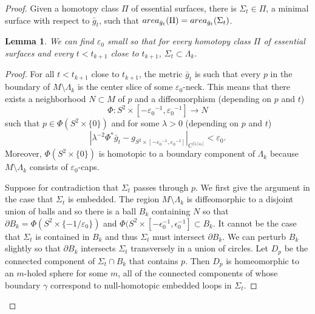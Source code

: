 \documentclass[11pt]{amsart}
\newtheorem{lemm}[thm]{Lemma}
\theoremstyle{remark}
\theoremstyle{definition}
\begin{document}
{{\begin{proof}
		Given a homotopy class $\Pi$ of essential surfaces, there is $\Sigma_t\in \Pi$, a minimal surface with respect to $\bar g_t$, such that ${\rm area}_{\bar g_t}(\Pi)={\rm area}_{\bar g_t}(\Sigma_t)$.
		
		\begin{lemm}We can find $\varepsilon_0$ small so that for every homotopy class $\Pi$ of essential surfaces  and  every  $t<t_{k+1}$ close to $t_{k+1}$, $\Sigma_t\subset \Lambda_k$.
		\end{lemm}
		\begin{proof}
			For all $t<t_{k+1}$ close to $t_{k+1}$, the metric $\bar g_t$ is such that every $p$ in the boundary of $M\setminus \Lambda_k$ is  the center slice of some $\varepsilon_0$-neck. This means that there exists a neighborhood $N\subset M$ of $p$ and a diffeomorphism (depending on $p$ and $t$)
			\[
			\Phi: S^2 \times [-{\varepsilon_0}^{-1}, {\varepsilon_0}^{-1}] \rightarrow N 
			\]
			such that $p\in \Phi(S^2 \times \{0\})$ and  for some $\lambda>0$ (depending on $p$ and $t$)
			\begin{equation} \label{closeness} 
				|\lambda^{-2}  \Phi^* {\bar g_{t}} - g_{S^2 \times [- {\varepsilon_0}^{-1}, {\varepsilon_0}^{-1}]}|_{C^{\lceil  1/{\varepsilon_0} \rceil}}< {\varepsilon_0}. 
			\end{equation} 
			Moreover, $\Phi(S^2 \times \{0\})$ is homotopic to a boundary component of $\Lambda_k$ because $M\setminus\Lambda_k$ consists of $\varepsilon_0$-caps.
			
			Suppose for contradiction that $\Sigma_{t}$ passes through $p$.  We first give the argument in the case that $\Sigma_t$ is embedded.  The region $M\setminus \Lambda_k$ is diffeomorphic to a disjoint union of balls and so there is a ball $B_k$ containing $N$ so that $\partial B_k=\Phi(S^2 \times \{- 1/{\varepsilon_0}\})$ and $\Phi(S^2 \times [-\epsilon_0^{-1}, \epsilon_0^{-1}] \subset B_k$. It cannot be the case that $\Sigma_{t}$ is contained in $B_k$ and thus $\Sigma_{t}$ must intersect $\partial B_k$.  We can perturb $B_k$ slightly so that $\partial B_k$ intersects $\Sigma_t$ transversely  in a union of circles.  Let $D_p$ be the connected component of  $\Sigma_t\cap B_k$ that contains $p$.  Then $D_p$ is homeomorphic to an $m$-holed sphere for some $m$, all of the connected components of whose boundary  $\gamma$ correspond to null-homotopic embedded loops in $\Sigma_t$.   
			

\end{proof}
\end{proof}}}
\end{document}
